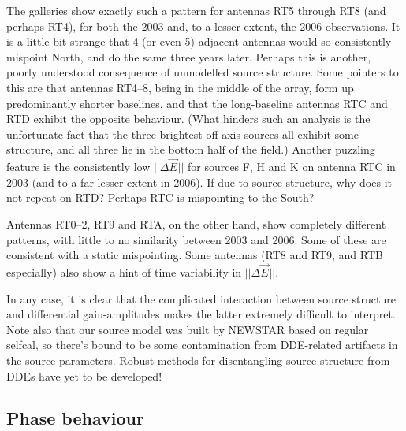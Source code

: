 \documentclass[]{aa}
\newcommand{\jones}[2]{\vec {#1}_{#2}}
\begin{document}
The galleries show exactly such a pattern for antennas RT5 through RT8 (and perhaps RT4), for both the 2003 and, to a lesser extent, the 2006 observations. It is a little bit strange that 4 (or even 5) adjacent antennas would so consistently mispoint North, and do the same three years later. Perhaps this is another, poorly understood consequence of unmodelled source structure. Some pointers to this are that antennas RT4--8, being in the middle of the array, form up predominantly shorter baselines, and that the long-baseline antennas RTC and RTD exhibit the opposite behaviour. (What hinders such an analysis is the unfortunate fact that the three brightest off-axis sources all exhibit some structure, and all three lie in the bottom half of the field.) Another puzzling feature is the consistently low $||\Delta\jones{E}{}||$ for sources F, H and K on antenna RTC in 2003 (and to a far lesser extent in 2006). If due to source structure, why does it not repeat on RTD? Perhaps RTC is mispointing to the South?

Antennas RT0--2, RT9 and RTA, on the other hand, show completely different patterns, with little to no similarity between 2003 and 2006. Some of these are consistent with a static mispointing. Some antennas (RT8 and RT9, and RTB especially) also show a hint of time variability in $||\Delta\jones{E}{}||$.

In any case, it is clear that the complicated interaction between source structure and differential gain-amplitudes makes the latter extremely difficult to interpret. Note also that our source model was built by NEWSTAR based on regular selfcal, so there's bound to be some contamination from DDE-related artifacts in the source parameters. Robust methods for disentangling source structure from DDEs have yet to be developed!

\subsection{Phase behaviour}

\end{document}
